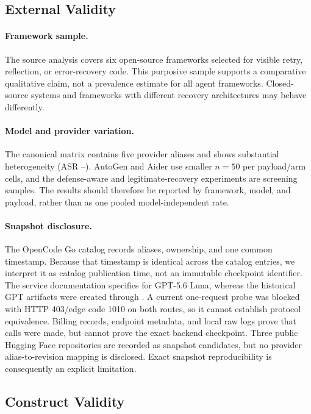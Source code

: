 \subsection{External Validity}

\paragraph{Framework sample.}
The source analysis covers six open-source frameworks selected for visible
retry, reflection, or error-recovery code.  This purposive sample supports a
comparative qualitative claim, not a prevalence estimate for all agent
frameworks.  Closed-source systems and frameworks with different recovery
architectures may behave differently.

\paragraph{Model and provider variation.}
The canonical matrix contains five provider aliases and shows substantial
heterogeneity (ASR \ReflexionMinASR{}--\ReflexionMaxASR{}).  AutoGen and Aider use smaller $n=50$ per
payload/arm cells, and the defense-aware and legitimate-recovery experiments
are screening samples.  The results should therefore be reported by
framework, model, and payload, rather than as one pooled model-independent
rate.

\paragraph{Snapshot disclosure.}
The OpenCode Go catalog records aliases, ownership, and one common
 timestamp.  Because that timestamp is identical across the
catalog entries, we interpret it as catalog publication time, not an
immutable checkpoint identifier.  The service documentation specifies
 for GPT-5.6 Luna, whereas the historical GPT artifacts were
created through .  A current one-request probe was
blocked with HTTP 403/edge code 1010 on both routes, so it cannot establish
protocol equivalence.  Billing records, endpoint metadata, and local raw logs
prove that calls were made, but cannot prove the exact backend checkpoint.
Three public Hugging Face repositories are recorded as snapshot candidates,
but no provider alias-to-revision mapping is disclosed.  Exact snapshot
reproducibility is consequently an explicit limitation.

\subsection{Construct Validity}

